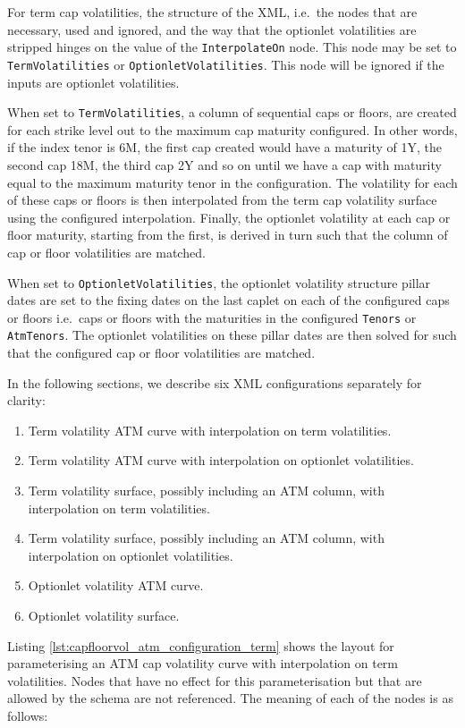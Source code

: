 For term cap volatilities, the structure of the XML, i.e.\ the nodes that are necessary, used and ignored, and the way that the optionlet volatilities are stripped hinges on the value of the \lstinline!InterpolateOn! node. This node may be set to \lstinline!TermVolatilities! or \lstinline!OptionletVolatilities!. This node will be ignored if the inputs are optionlet volatilities.

When set to \lstinline!TermVolatilities!, a column of sequential caps or floors, are created for each strike level out to the maximum cap maturity configured. In other words, if the index tenor is 6M, the first cap created would have a maturity of 1Y, the second cap 18M, the third cap 2Y and so on until we have a cap with maturity equal to the maximum maturity tenor in the configuration. The volatility for each of these caps or floors is then interpolated from the term cap volatility surface using the configured interpolation. Finally, the optionlet volatility at each cap or floor maturity, starting from the first, is derived in turn such that the column of cap or floor volatilities are matched.

When set to \lstinline!OptionletVolatilities!, the optionlet volatility structure pillar dates are set to the fixing dates on the last caplet on each of the configured caps or floors i.e.\ caps or floors with the maturities in the configured \lstinline!Tenors! or \lstinline!AtmTenors!. The optionlet volatilities on these pillar dates are then solved for such that the configured cap or floor volatilities are matched. 

In the following sections, we describe six XML configurations separately for clarity:

\begin{enumerate}
\item Term volatility ATM curve with interpolation on term volatilities.
\item Term volatility ATM curve with interpolation on optionlet volatilities.
\item Term volatility surface, possibly including an ATM column, with interpolation on term volatilities.
\item Term volatility surface, possibly including an ATM column, with interpolation on optionlet volatilities.
\item Optionlet volatility ATM curve.
\item Optionlet volatility surface.
\end{enumerate}

Listing \ref{lst:capfloorvol_atm_configuration_term} shows the layout for parameterising an ATM cap volatility curve with interpolation on term volatilities. Nodes that have no effect for this parameterisation but that are allowed by the schema are not referenced. The meaning of each of the nodes is as follows:

